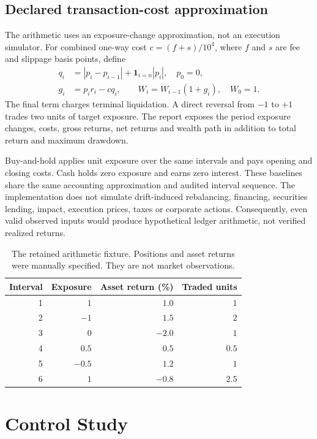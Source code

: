\documentclass[sigconf,anonymous,nonacm]{acmart}
\begin{document}
\subsection{Declared transaction-cost approximation}
The arithmetic uses an exposure-change approximation, not an execution simulator. For combined one-way cost $c=(f+s)/10^4$, where $f$ and $s$ are fee and slippage basis points, define
\begin{align}
 q_i &= |p_i-p_{i-1}|+\mathbf{1}_{i=n}|p_i|,\quad p_0=0,\\
 g_i &= p_i r_i-cq_i,\qquad W_i=W_{i-1}(1+g_i),\quad W_0=1.
\end{align}
The final term charges terminal liquidation. A direct reversal from $-1$ to $+1$ trades two units of target exposure. The report exposes the period exposure changes, costs, gross returns, net returns and wealth path in addition to total return and maximum drawdown.

Buy-and-hold applies unit exposure over the same intervals and pays opening and closing costs. Cash holds zero exposure and earns zero interest. These baselines share the same accounting approximation and audited interval sequence. The implementation does not simulate drift-induced rebalancing, financing, securities lending, impact, execution prices, taxes or corporate actions. Consequently, even valid observed inputs would produce hypothetical ledger arithmetic, not verified realized returns.

\begin{table}[t]
\caption{The retained arithmetic fixture. Positions and asset returns were manually specified. They are not market observations.}
\label{tab:ledger}
\centering
\begin{tabular}{rrrr}
\toprule
Interval & Exposure & Asset return (\%) & Traded units\\
\midrule
1 & $1$ & $1.0$ & $1$\\
2 & $-1$ & $1.5$ & $2$\\
3 & $0$ & $-2.0$ & $1$\\
4 & $0.5$ & $0.5$ & $0.5$\\
5 & $-0.5$ & $1.2$ & $1$\\
6 & $1$ & $-0.8$ & $2.5$\\
\bottomrule
\end{tabular}
\end{table}

\section{Control Study}
\end{document}
